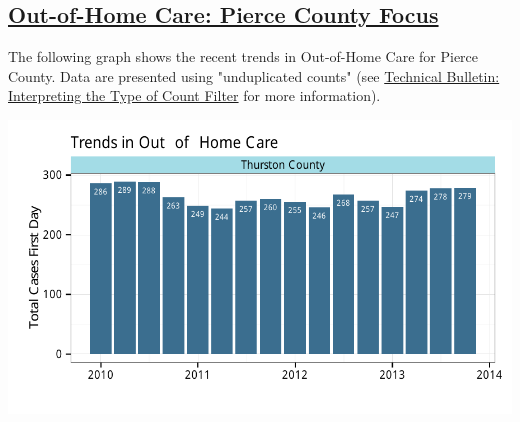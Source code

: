 \documentclass{article}\usepackage{graphicx, color}
\makeatletter
\def\maxwidth{ %
  \ifdim\Gin@nat@width>\linewidth
    \linewidth
  \else
    \Gin@nat@width
  \fi
}
\newenvironment{knitrout}{}{} %
\makeatother
\begin{document}
\subsection{\href{http://www.partnersforourchildren.org/child-well-being/visualizations/out-home-care/trends}
 {Out-of-Home Care: Pierce County Focus}
}
The following graph shows the recent trends in Out-of-Home Care for
Pierce County. Data are presented using "unduplicated counts" (see \href{http://http://www.partnersforourchildren.org/publications/using-different-count-types-data-portal}{Technical Bulletin: Interpreting the Type of Count Filter} for more information). 
\nopagebreak[3]
\begin{knitrout}
\color{fgcolor}

{\centering \includegraphics[width=\maxwidth]{figure/ooh_focus} 

}



\end{knitrout}
\end{document}
